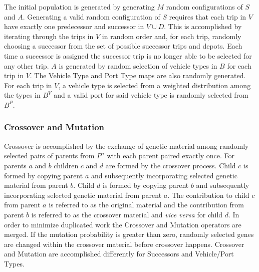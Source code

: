 The initial population is generated by generating $M$ random configurations of $S$ and $A$. Generating a valid random configuration of $S$ requires that each trip in $V$ have exactly one predecessor and successor in $V \cup D$. This is accomplished by iterating through the trips in $V$ in random order and, for each trip, randomly choosing a successor from the set of possible successor trips and depots. Each time a successor is assigned the successor trip is no longer able to be selected for any other trip. $A$ is generated by random selection of vehicle types in $B$ for each trip in $V$. The Vehicle Type and Port Type maps are also randomly generated. For each trip in $V$, a vehicle type is selected from a weighted distribution among the types in $B^V$ and a valid port for said vehicle type is randomly selected from $B^P$. 

\subsubsection{Crossover and Mutation}

Crossover is accomplished by the exchange of genetic material among randomly selected pairs of parents from $P^n$ with each parent paired exactly once. For parents $a$ and $b$ children $c$ and $d$ are formed by the crossover process. Child $c$ is formed by copying parent $a$ and subsequently incorporating selected genetic material from parent $b$. Child $d$ is formed by copying parent $b$ and subsequently incorporating selected genetic material from parent $a$. The contribution to child $c$ from parent $a$ is referred to as the original material and the contribution from parent $b$ is referred to as the crossover material and \textit{vice versa} for child $d$. In order to minimize duplicated work the Crossover and Mutation operators are merged. If the mutation probability is greater than zero, randomly selected genes are changed within the crossover material before crossover happens. Crossover and Mutation are accomplished differently for Successors and Vehicle/Port Types.

